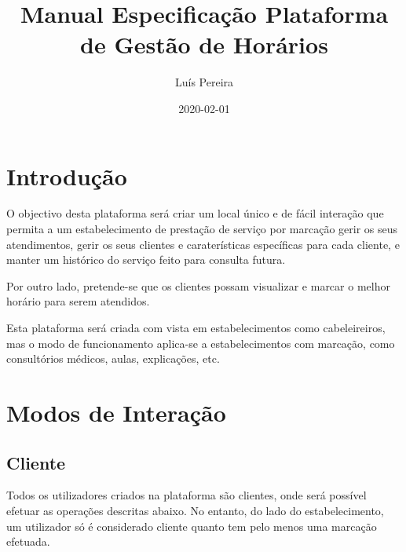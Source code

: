 \documentclass[12pt]{article}
\title{Manual Especificação Plataforma de Gestão de Horários}
\date{2020-02-01}
\author{Luís Pereira}
\begin{document}
	\maketitle
	\newpage

	\section{Introdução}
	
	O objectivo desta plataforma será criar um local único e de fácil interação que permita a um estabelecimento
	de prestação de serviço por marcação gerir os seus atendimentos, gerir os seus clientes e caraterísticas 
	específicas para cada cliente, e manter um histórico do serviço feito para consulta futura. 

	Por outro lado, pretende-se que os clientes possam visualizar e marcar o melhor horário para serem atendidos.

	Esta plataforma será criada com vista em estabelecimentos como cabeleireiros, mas o modo de funcionamento aplica-se
	a estabelecimentos com marcação, como consultórios médicos, aulas, explicações, etc.


	\section{Modos de Interação}

	\subsection{Cliente}

	Todos os utilizadores criados na plataforma são clientes, onde será possível efetuar as operações descritas
	abaixo. No entanto, do lado do estabelecimento, um utilizador só é considerado cliente quanto tem pelo menos
	uma marcação efetuada. 
\end{document}
